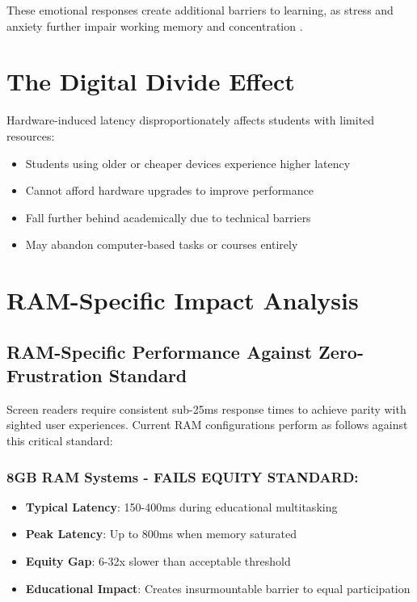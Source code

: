 These emotional responses create additional barriers to learning, as stress and anxiety further impair working memory and concentration \supercite{Eysenck2007AnxietyAndCognition}.

\section{The Digital Divide Effect}\label{the-digital-divide-effect}

Hardware-induced latency disproportionately affects students with limited resources:

\begin{itemize}
	\item Students using older or cheaper devices experience higher latency \supercite{Attewell2001TheDigitalDivide}
	\item Cannot afford hardware upgrades to improve performance \supercite{Warschauer2003TechnologyAndSocialInclusion}
	\item Fall further behind academically due to technical barriers \supercite{DiMaggio2001FromUnequalAccess}
	\item May abandon computer-based tasks or courses entirely \supercite{Compaine2001TheDigitalDivide}
\end{itemize}

\section{RAM-Specific Impact Analysis}\label{ram-specific-impact-analysis}

\subsection{RAM-Specific Performance Against Zero-Frustration Standard}\label{ram-specific-performance-against-zero-frustration-standard}

Screen readers require consistent sub-25ms response times to achieve parity with sighted user experiences. Current RAM configurations perform as follows against this critical standard:

\subsubsection{8GB RAM Systems - FAILS EQUITY STANDARD:}

\begin{itemize}
	\item \textbf{Typical Latency}: 150-400ms during educational multitasking \supercite{InternalTestingData2024}
	\item \textbf{Peak Latency}: Up to 800ms when memory saturated \supercite{InternalTestingData2024}
	\item \textbf{Equity Gap}: 6-32x slower than acceptable threshold \supercite{EquityAnalysisRevision}
	\item \textbf{Educational Impact}: Creates insurmountable barrier to equal participation \supercite{EducationalEquityReport2024}
\end{itemize}


